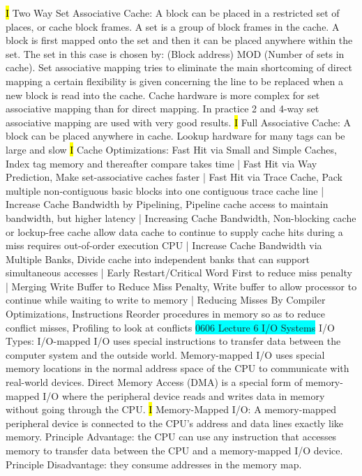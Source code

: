 \documentclass[fontsize=4pt]{scrartcl}
\begin{document}
\hl{I}
Two Way Set Associative Cache: A block can be placed in a restricted set of places, or cache block frames. A set is a group of block frames in the cache. A block is first mapped onto the set and then it can be placed anywhere within the set.  The set in this case is chosen by:  (Block address)  MOD  (Number of sets in cache). Set associative mapping tries to eliminate the main shortcoming of direct mapping a certain flexibility is given concerning the line to be replaced when a new block is read into the cache. Cache hardware is more complex for set associative mapping than for direct mapping. In practice 2 and 4-way set associative mapping are used with very good results.
\hl{I}
Full Associative Cache: A block can be placed anywhere in cache. Lookup hardware for many tags can be large and slow
\hl{I}
Cache Optimizations: Fast Hit via Small and Simple Caches, Index tag memory and thereafter compare takes time | Fast Hit via Way Prediction, Make set-associative caches faster | Fast Hit via Trace Cache, Pack multiple non-contiguous basic blocks into one contiguous trace cache line | Increase Cache Bandwidth by Pipelining, Pipeline cache access to maintain bandwidth, but higher latency | Increasing Cache Bandwidth, Non-blocking cache or  lockup-free cache allow data cache to continue to supply cache hits during a miss requires out-of-order execution CPU | Increase Cache Bandwidth via Multiple Banks, Divide cache into independent banks that can support simultaneous accesses | Early Restart/Critical Word First to reduce miss penalty | Merging Write Buffer to Reduce Miss Penalty, Write buffer to allow processor to continue while waiting to write to memory | Reducing Misses By Compiler Optimizations, Instructions Reorder procedures in memory so as to reduce conflict misses, Profiling to look at conflicts
\colorbox{Cyan}{0606 Lecture 6 I/O Systems} I/O Types: I/O-mapped I/O uses special instructions to transfer data between the computer system and the outside world. Memory-mapped I/O uses special memory locations in the normal address space of the CPU to communicate with real-world devices. Direct Memory Access (DMA) is a special form of memory-mapped I/O where the peripheral device reads and writes data in memory without going through the CPU.
\hl{I}
Memory-Mapped I/O: A memory-mapped peripheral device is connected to the CPU's address and data lines exactly like memory. Principle Advantage: the CPU can use any instruction that accesses memory to transfer data between the CPU and a memory-mapped I/O device. Principle Disadvantage: they consume addresses in the memory map.
\end{document}
